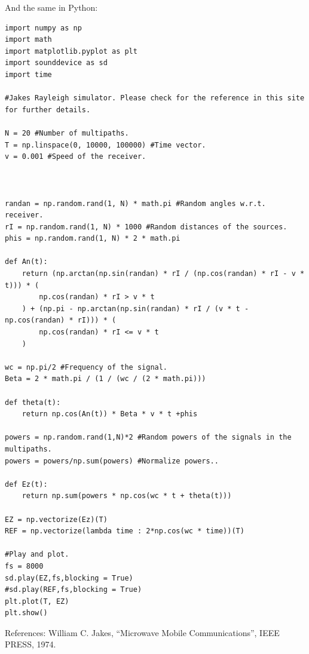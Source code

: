 \documentclass{article}
\begin{document}
\vspace{2cm}
And the same in Python:

\begin{verbatim}
import numpy as np
import math
import matplotlib.pyplot as plt
import sounddevice as sd
import time

#Jakes Rayleigh simulator. Please check for the reference in this site for further details.

N = 20 #Number of multipaths.
T = np.linspace(0, 10000, 100000) #Time vector.
v = 0.001 #Speed of the receiver. 



randan = np.random.rand(1, N) * math.pi #Random angles w.r.t. receiver.
rI = np.random.rand(1, N) * 1000 #Random distances of the sources.
phis = np.random.rand(1, N) * 2 * math.pi 

def An(t):
    return (np.arctan(np.sin(randan) * rI / (np.cos(randan) * rI - v * t))) * (
        np.cos(randan) * rI > v * t
    ) + (np.pi - np.arctan(np.sin(randan) * rI / (v * t - np.cos(randan) * rI))) * (
        np.cos(randan) * rI <= v * t
    )

wc = np.pi/2 #Frequency of the signal.
Beta = 2 * math.pi / (1 / (wc / (2 * math.pi)))

def theta(t):
    return np.cos(An(t)) * Beta * v * t +phis

powers = np.random.rand(1,N)*2 #Random powers of the signals in the multipaths.
powers = powers/np.sum(powers) #Normalize powers..

def Ez(t):
    return np.sum(powers * np.cos(wc * t + theta(t)))

EZ = np.vectorize(Ez)(T)
REF = np.vectorize(lambda time : 2*np.cos(wc * time))(T)

#Play and plot.
fs = 8000
sd.play(EZ,fs,blocking = True)
#sd.play(REF,fs,blocking = True)
plt.plot(T, EZ)
plt.show()  
\end{verbatim}


\vspace{2cm}
References:
 William C. Jakes, ``Microwave Mobile Communications'', IEEE PRESS, 1974. 




  
   
\end{document}

